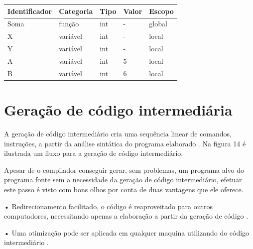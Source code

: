 \documentclass[12pt,oneside,a4paper,chapter=TITLE,section=TITLE,sumario=tradicional]{abntex2}
\begin{document}
\begin{quadro}[htb]
    \centering
    \vspace{0.5cm}
    \begin{tabular}{|p{3.0cm}|p{3.0cm}|p{3.0cm}|p{3.0cm}|p{3.0cm}|}
        \hline
        \textbf{Identificador} & \textbf{Categoria} & \textbf{Tipo} & \textbf{Valor} & \textbf{Escopo} \\ 
        \hline\hline
        Soma & função & int  &  -  & global   \\ \hline 
        X & variável  & int  & - & local  \\ \hline
        Y & variável  & int  &  -  & local  \\ \hline
        A & variável  & int  &  5  & local   \\ \hline
        B & variável  & int  & 6  & local   \\ \hline
    \end{tabular}

    
\end{quadro}


\section{Geração de código intermediária}
\label{sec:geracao-de-codigo-intermediaria}

A geração de código intermediário cria uma sequência linear de comandos, instruções, a partir da análise sintática do programa elaborado \cite{pedro2018}. Na figura 14 é ilustrada um fluxo para a geração de código intermediário.

\begin{figure}[H]
\end{figure}

Apesar de o compilador conseguir gerar, sem problemas, um programa alvo do programa fonte sem a necessidade da geração de código intermediário, efetuar este passo é visto com bons olhos por conta de duas vantagens que ele oferece.

•	Redirecionamento facilitado, o código é reaproveitado para outros computadores, necessitando apenas a elaboração a partir da geração de código \cite{alfred1995}.


•	Uma otimização pode ser aplicada em qualquer maquina utilizando do código intermediário \cite{alfred1995}.
\end{document}
